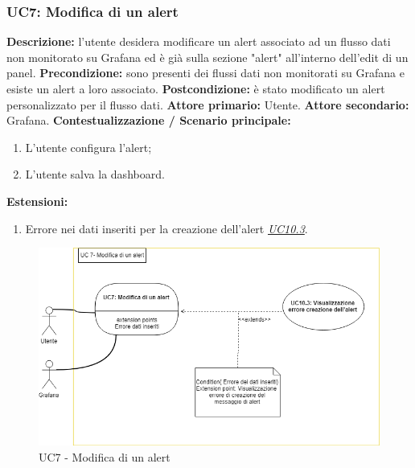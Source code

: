                 \subsubsection{UC7: Modifica di un alert}
                    \textbf{Descrizione:} l’utente desidera modificare un alert associato ad un flusso dati non monitorato su Grafana ed è già sulla sezione "alert" all'interno dell'edit di un panel.
                    \newline
                    \textbf{Precondizione:} sono presenti dei flussi dati non monitorati su Grafana e esiste un alert a loro associato.
                    \newline
                    \textbf{Postcondizione:} è stato modificato un alert personalizzato per il flusso dati.
                    \newline
                    \textbf{Attore primario:} Utente.
                    \newline
                    \textbf{Attore secondario:} Grafana.
                    \newline
                    \textbf{Contestualizzazione / Scenario principale:} \begin{enumerate}
                            \item L’utente configura l’alert;
                            \item L’utente salva la dashboard.
                        \end{enumerate}
                    
                    \textbf{Estensioni:} 
                    \begin{enumerate}
                            \item Errore nei dati inseriti per la creazione dell'alert \underline{\textit{UC10.3}}.
                        \end{enumerate}
                        
                		\begin{figure}[!htbp]
		                	\centering
		                	\includegraphics[width=\textwidth]{UC7.png}
		                	\caption{UC7 - Modifica di un alert}
		                \end{figure}
	                \clearpage
                        
